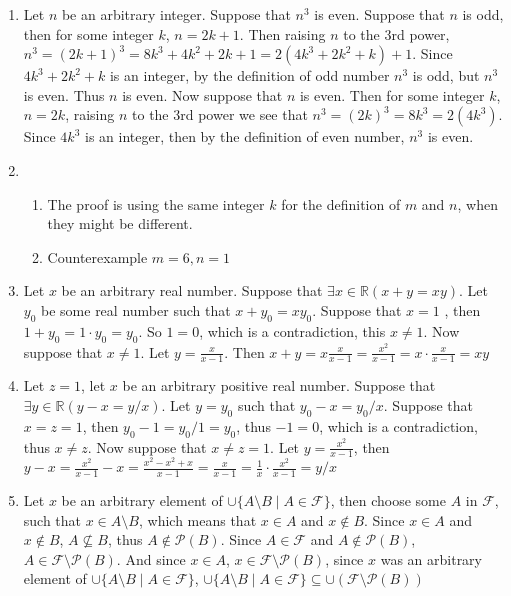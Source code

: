 \begin{enumerate}
    \item
    Let $n$ be an arbitrary integer. Suppose that $n^3$ is even. Suppose that $n$ is odd, then for some integer $k$, $n = 2k + 1$. Then raising $n$ to the 3rd power, $n^3 = (2k + 1)^3 = 8k^3 + 4k^2 + 2k + 1 = 2(4k^3 + 2k^2 + k) + 1$. Since $4k^3 + 2k^2 + k$ is an integer, by the definition of odd number $n^3$ is odd, but $n^3$ is even. Thus $n$ is even.
    Now suppose that $n$ is even. Then for some integer $k$, $n = 2k$, raising $n$ to the 3rd power we see that $n^3 = (2k)^3 = 8k^3 = 2(4k^3)$. Since $4k^3$ is an integer, then by the definition of even number, $n^3$ is even.
    \item
    \begin{enumerate}
        \item
    The proof is using the same integer $k$ for the definition of $m$ and $n$, when they might be different.
        \item 
    Counterexample $m = 6, n = 1$
    \end{enumerate}
    \item
    Let $x$ be an arbitrary real number. Suppose that $\exists x \in \mathbb{R}(x + y = xy)$. Let $y_0$ be some real number such that $x + y_0 = xy_0$. Suppose that $x = 1$ , then $1 + y_0 = 1 \cdot y_0 = y_0$. So $1 = 0$, which is a contradiction, this $x \neq 1$.
    Now suppose that $x \neq 1$. Let $y = \frac{x}{x - 1}$. Then $x + y = x \frac{x}{x - 1} = \frac{x^2}{x -1} = x \cdot \frac{x}{x - 1} = xy$
    \item
    Let $z = 1$, let $x$ be an arbitrary positive real number. Suppose that $\exists y \in \mathbb{R}(y - x = y / x)$. Let $y = y_0$ such that $y_0 - x = y_0 / x$. Suppose that $x = z = 1$, then $y_0 - 1 = y_0 / 1 = y_0$, thus $-1 = 0$, which is a contradiction, thus $x \neq z$. 
    Now suppose that $x \neq z = 1$. Let $y = \frac{x^2}{x - 1}$, then $y - x = \frac{x^2}{x - 1} - x = \frac{x^2 - x^2 + x}{x - 1} = \frac{x}{x - 1} = \frac{1}{x} \cdot \frac{x^2}{x - 1} = y/x$
    \item
    Let $x$ be an arbitrary element of $\cup \{A \setminus B \mid A \in \mathscr{F}\}$, then choose some $A$ in $\mathscr{F}$, such that $x \in A \setminus B$, which means that $x \in A$ and $x \notin B$. Since $x \in A$ and $x \notin B$, $A \not \subseteq B$, thus $A \not \in \mathscr{P}(B)$. Since $A \in \mathscr{F}$ and $A \not \in \mathscr{P}(B)$, $A \in \mathscr{F} \setminus \mathscr{P}(B)$. And since $x \in A$, $x \in \mathscr{F} \setminus \mathscr{P}(B)$, since $x$ was an arbitrary element of $\cup \{A \setminus B \mid A \in \mathscr{F}\}$, $\cup \{A \setminus B \mid A \in \mathscr{F}\} \subseteq \cup(\mathscr{F} \setminus \mathscr{P}(B))$

\end{enumerate}
